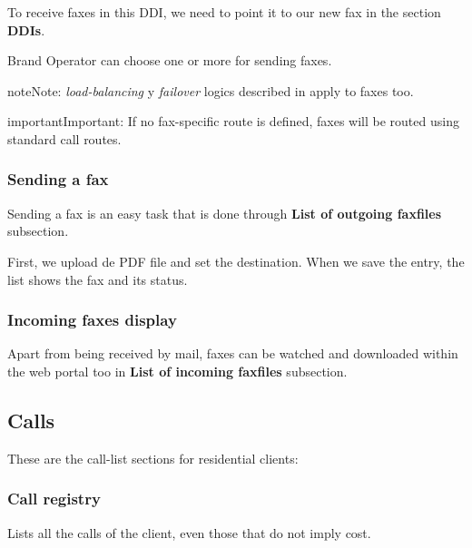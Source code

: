 \documentclass[letterpaper,10pt,english]{sphinxmanual}
\begin{document}
To receive faxes in this DDI, we need to point it to our new fax in the section
\textbf{DDIs}.

Brand Operator can choose one or more {\hyperref[administration_portal/brand/routing/outgoing_routings:outgoing\string-routings]{}} for sending faxes.

\begin{notice}{note}{Note:}
\emph{load-balancing} y \emph{failover} logics described in {\hyperref[administration_portal/brand/routing/outgoing_routings:outgoing\string-routings]{}}
apply to faxes too.
\end{notice}

\begin{notice}{important}{Important:}
If no fax-specific route is defined, faxes will be routed using
standard call routes.
\end{notice}


\subsubsection{Sending a fax}
\label{administration_portal/client/residential/faxes:sending-a-fax}
Sending a fax is an easy task that is done through \textbf{List of outgoing faxfiles} subsection.

First, we upload de PDF file and set the destination. When we save the entry, the list shows the fax and its status.


\subsubsection{Incoming faxes display}
\label{administration_portal/client/residential/faxes:incoming-faxes-display}
Apart from being received by mail, faxes can be watched and downloaded within
the web portal too in \textbf{List of incoming faxfiles} subsection.


\subsection{Calls}
\label{administration_portal/client/residential/calls/index::doc}\label{administration_portal/client/residential/calls/index:calls}
These are the call-list sections for residential clients:


\subsubsection{Call registry}
\label{administration_portal/client/residential/calls/call_registry::doc}\label{administration_portal/client/residential/calls/call_registry:call-registry}\label{administration_portal/client/residential/calls/call_registry:id1}
Lists all the calls of the client, even those that do not imply cost.
\end{document}

